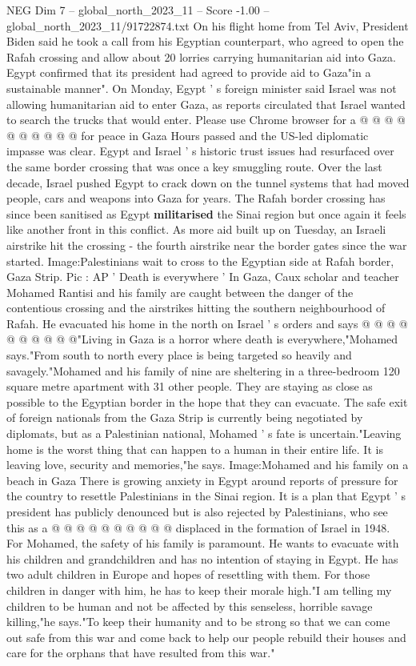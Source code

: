\begin{textsample}{NEG Dim 7 – global\_north\_2023\_11 – Score -1.00 – global\_north\_2023\_11/91722874.txt}
On his flight home from Tel Aviv, President Biden said he took a call from his Egyptian counterpart, who agreed to open the Rafah crossing and allow about 20 lorries carrying humanitarian aid into Gaza.
Egypt confirmed that its president had agreed to provide aid to Gaza"in a sustainable manner".
On Monday, Egypt ' s foreign minister said Israel was not allowing humanitarian aid to enter Gaza, as reports circulated that Israel wanted to search the trucks that would enter.
Please use Chrome browser for a @ @ @ @ @ @ @ @ @ @ for peace in Gaza Hours passed and the US-led diplomatic impasse was clear.
Egypt and Israel ' s historic trust issues had resurfaced over the same border crossing that was once a key smuggling route.
Over the last decade, Israel pushed Egypt to crack down on the tunnel systems that had moved people, cars and weapons into Gaza for years.
The Rafah border crossing has since been sanitised as Egypt \textbf{militarised} the Sinai region but once again it feels like another front in this conflict.
As more aid built up on Tuesday, an Israeli airstrike hit the crossing - the fourth airstrike near the border gates since the war started.
Image:Palestinians wait to cross to the Egyptian side at Rafah border, Gaza Strip.
Pic : AP ' Death is everywhere ' In Gaza, Caux scholar and teacher Mohamed Rantisi and his family are caught between the danger of the contentious crossing and the airstrikes hitting the southern neighbourhood of Rafah.
He evacuated his home in the north on Israel ' s orders and says @ @ @ @ @ @ @ @ @ @"Living in Gaza is a horror where death is everywhere,"Mohamed says."From south to north every place is being targeted so heavily and savagely."Mohamed and his family of nine are sheltering in a three-bedroom 120 square metre apartment with 31 other people.
They are staying as close as possible to the Egyptian border in the hope that they can evacuate.
The safe exit of foreign nationals from the Gaza Strip is currently being negotiated by diplomats, but as a Palestinian national, Mohamed ' s fate is uncertain."Leaving home is the worst thing that can happen to a human in their entire life.
It is leaving love, security and memories,"he says.
Image:Mohamed and his family on a beach in Gaza There is growing anxiety in Egypt around reports of pressure for the country to resettle Palestinians in the Sinai region.
It is a plan that Egypt ' s president has publicly denounced but is also rejected by Palestinians, who see this as a @ @ @ @ @ @ @ @ @ @ displaced in the formation of Israel in 1948.
For Mohamed, the safety of his family is paramount.
He wants to evacuate with his children and grandchildren and has no intention of staying in Egypt.
He has two adult children in Europe and hopes of resettling with them.
For those children in danger with him, he has to keep their morale high."I am telling my children to be human and not be affected by this senseless, horrible savage killing,"he says."To keep their humanity and to be strong so that we can come out safe from this war and come back to help our people rebuild their houses and care for the orphans that have resulted from this war."

\end{textsample}
